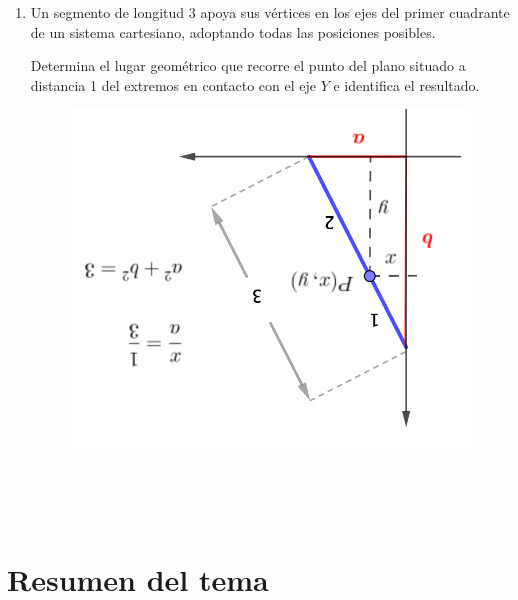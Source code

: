 \begin{enumerate}
\vspace{-4mm}
\begin{flushright}
\begin{scriptsize} \textcolor{gris}{}	\end{scriptsize}
\end{flushright}



\vspace{5mm}
\item	Un segmento de longitud 3 apoya sus vértices en los ejes del primer cuadrante de un sistema cartesiano, adoptando todas las posiciones posibles.

Determina el lugar geométrico que recorre el punto del plano situado a distancia 1 del extremos en contacto con el eje $Y$ e identifica el resultado.
\begin{multicols}{2}
\begin{figure}[H]
	\centering
	\includegraphics[width=.3\textwidth]{img-conicas/conicas46.png}
	\end{figure}

\begin{footnotesize} 

 	\textcolor{gris}{}	
 	
 	$\quad$
 
 	\textcolor{gris}{}	
 	
 	$\quad$
 
	\textcolor{gris}{}
\end{footnotesize}

\end{multicols}
\end{enumerate}



\newpage
\vspace{1cm}
\section{Resumen del tema}
\vspace{1cm}


